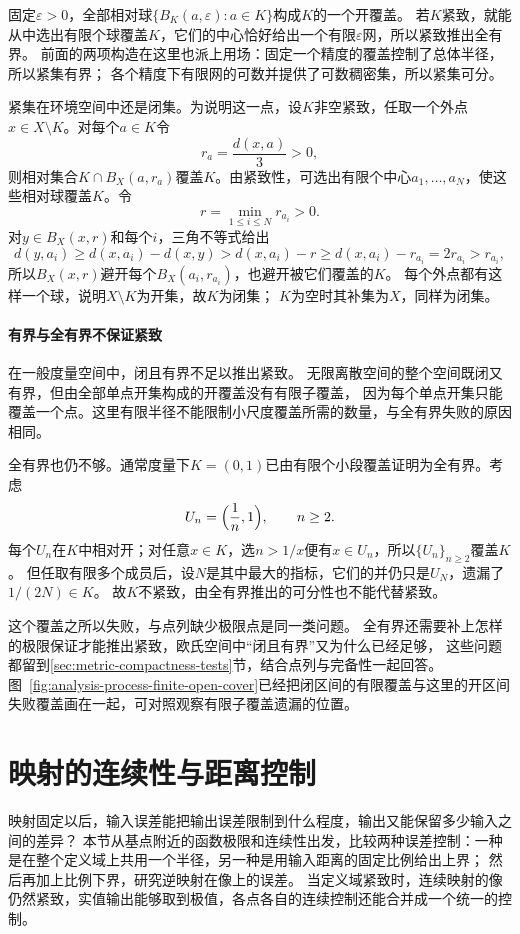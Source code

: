 固定$\varepsilon>0$，全部相对球$\{B_K(a,\varepsilon):a\in K\}$构成$K$的一个开覆盖。
若$K$紧致，就能从中选出有限个球覆盖$K$，它们的中心恰好给出一个有限$\varepsilon$网，所以紧致推出全有界。
前面的两项构造在这里也派上用场：固定一个精度的覆盖控制了总体半径，所以紧集有界；
各个精度下有限网的可数并提供了可数稠密集，所以紧集可分。

紧集在环境空间中还是闭集。为说明这一点，设$K$非空紧致，任取一个外点$x\in X\setminus K$。对每个$a\in K$令
\[
  r_a=\frac{d(x,a)}{3}>0,
\]
则相对集合$K\cap B_X(a,r_a)$覆盖$K$。由紧致性，可选出有限个中心$a_1,\ldots,a_N$，使这些相对球覆盖$K$。令
\[
  r=\min_{1\leq i\leq N}r_{a_i}>0.
\]
对$y\in B_X(x,r)$和每个$i$，三角不等式给出
\[
  d(y,a_i)\geq d(x,a_i)-d(x,y)>d(x,a_i)-r\geq d(x,a_i)-r_{a_i}=2r_{a_i}>r_{a_i},
\]
所以$B_X(x,r)$避开每个$B_X(a_i,r_{a_i})$，也避开被它们覆盖的$K$。
每个外点都有这样一个球，说明$X\setminus K$为开集，故$K$为闭集；
$K$为空时其补集为$X$，同样为闭集。

\paragraph{有界与全有界不保证紧致}

在一般度量空间中，闭且有界不足以推出紧致。
无限离散空间的整个空间既闭又有界，但由全部单点开集构成的开覆盖没有有限子覆盖，
因为每个单点开集只能覆盖一个点。这里有限半径不能限制小尺度覆盖所需的数量，与全有界失败的原因相同。

全有界也仍不够。通常度量下$K=(0,1)$已由有限个小段覆盖证明为全有界。考虑
\[
  U_n=\Bigl(\frac1n,1\Bigr),\qquad n\geq2.
\]
每个$U_n$在$K$中相对开；对任意$x\in K$，选$n>1/x$便有$x\in U_n$，所以$\{U_n\}_{n\geq2}$覆盖$K$。
但任取有限多个成员后，设$N$是其中最大的指标，它们的并仍只是$U_N$，遗漏了$1/(2N)\in K$。
故$K$不紧致，由全有界推出的可分性也不能代替紧致。

这个覆盖之所以失败，与点列缺少极限点是同一类问题。
全有界还需要补上怎样的极限保证才能推出紧致，欧氏空间中“闭且有界”又为什么已经足够，
这些问题都留到\ref{sec:metric-compactness-tests}节，结合点列与完备性一起回答。
图~\ref{fig:analysis-process-finite-open-cover}已经把闭区间的有限覆盖与这里的开区间失败覆盖画在一起，可对照观察有限子覆盖遗漏的位置。

\section{映射的连续性与距离控制}
\label{sec:metric-map-error-transfer}

映射固定以后，输入误差能把输出误差限制到什么程度，输出又能保留多少输入之间的差异？
本节从基点附近的函数极限和连续性出发，比较两种误差控制：一种是在整个定义域上共用一个半径，另一种是用输入距离的固定比例给出上界；
然后再加上比例下界，研究逆映射在像上的误差。
当定义域紧致时，连续映射的像仍然紧致，实值输出能够取到极值，各点各自的连续控制还能合并成一个统一的控制。

